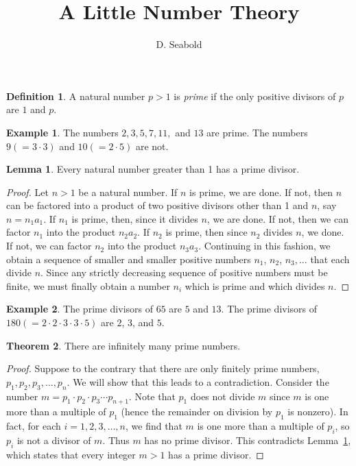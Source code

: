 \documentclass[12pt]{amsart}
\theoremstyle{definition}
\newtheorem*{defn}{Definition}
\newtheorem*{example}{Example}
\theoremstyle{theorem}
\newtheorem{thm}{Theorem}
\newtheorem{lemma}[thm]{Lemma}
\begin{document}
\title{A Little Number Theory}
\author{D. Seabold}

\maketitle

\begin{defn}
A natural number $p>1$ is {\em prime} if the only positive divisors of $p$ are $1$ and $p$.
\end{defn}

\begin{example}
The numbers $2, 3, 5, 7, 11,$ and $13$ are prime.  The numbers $9(=3\cdot 3)$ and $10(=2\cdot 5)$ are not.
\end{example}

\begin{lemma}
\label{divisibility}
Every natural number greater than 1 has a prime divisor.
\end{lemma}

\begin{proof} Let $n>1$ be a natural number.  If $n$ is prime, we are done.  If not, then $n$ can be factored into a product of two positive divisors other than 1 and $n$, say $n=n_1 a_1$.  If $n_1$ is prime, then, since it divides $n$, we are done.  If not, then we can factor $n_1$ into the product $n_2a_2$.  If $n_2$ is prime, then since $n_2$ divides $n$, we done.  If not, we can factor $n_2$ into the product $n_3a_3$.  Continuing in this fashion, we obtain a sequence of smaller and smaller positive numbers $n_1$, $n_2$, $n_3, \ldots$ that each divide $n$. Since any strictly decreasing sequence of  positive numbers must be finite, we must finally obtain a number $n_i$ which is prime and which divides $n$.
\end{proof}

\begin{example}
The prime divisors of $65$ are $5$ and $13$.  The prime divisors of $180(=2\cdot 2\cdot 3\cdot 3\cdot 5)$ are $2$, $3$, and $5$.
\end{example}

\begin{thm}
There are infinitely many prime numbers.
\end{thm}
\begin{proof}  Suppose to the contrary that there are only finitely prime numbers, $p_1, p_2, p_3,\ldots, p_n$.  We will show that this leads to a contradiction.  Consider the number $m=p_1\cdot p_2\cdot p_3\cdots p_{n+1}$.  Note that $p_1$ does not divide $m$ since $m$ is one more than a multiple of $p_1$ (hence the remainder on division by $p_1$ is nonzero).  In fact, for each $i=1, 2, 3,\ldots, n$, we find that $m$ is one more than a multiple of $p_i$, so $p_i$ is not a divisor of $m$.  Thus $m$ has no prime divisor.  This contradicts Lemma~\ref{divisibility}, which states that every integer $m>1$ has a prime divisor.
\end{proof}
\end{document}
